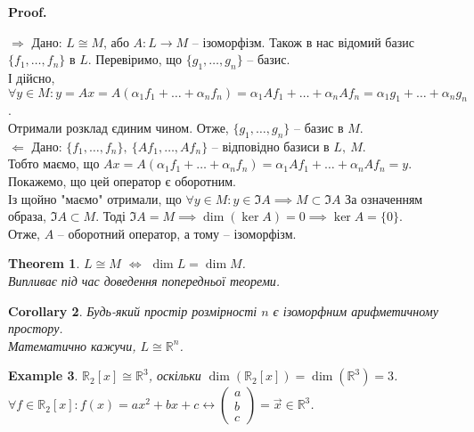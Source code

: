\documentclass[a4paper, 10pt]{article}
\makeatletter
\def\rightproof{$\boxed{\Rightarrow}$ }
\def\leftproof{$\boxed{\Leftarrow}$ }
\theoremstyle{theoremdd}
\newtheorem{theorem}{Theorem}[subsection]
\newtheorem{example}[theorem]{Example}
\newtheorem{corollary}[theorem]{Corollary}
\renewenvironment{proof}[1][Proof.\\]{\par
\pushQED{\hfill \qed}%
\normalfont \topsep6\p@\@plus6\p@\relax
\trivlist
\item\relax
{\bfseries
#1\@addpunct{.}}\hspace\labelsep\ignorespaces
}{%
\popQED\endtrivlist\@endpefalse
}
\makeatother
\begin{document}
	\begin{proof}
	\rightproof Дано: $L \cong M$, або $A \colon L \to M$ -- ізоморфізм. Також в нас відомий базис $\{f_1,\dots,f_n\}$ в $L$. Перевіримо, що $\{g_1,\dots,g_n\}$ -- базис.\\
	І дійсно, $\forall y \in M: y = Ax = A(\alpha_1 f_1 + \dots + \alpha_n f_n) = \alpha_1 Af_1 + \dots + \alpha_n Af_n = \alpha_1 g_1 + \dots + \alpha_n g_n$.\\
	Отримали розклад єдиним чином. Отже, $\{g_1,\dots,g_n\}$ -- базис в $M$.
	\bigskip \\
	\leftproof Дано: $\{f_1,\dots,f_n\},\ \{Af_1,\dots,Af_n\}$ -- відповідно базиси в $L,\ M$.\\
	Тобто маємо, що $Ax = A(\alpha_1 f_1 + \dots + \alpha_n f_n) = \alpha_1 Af_1 + \dots + \alpha_n Af_n = y$.\\
	Покажемо, що цей оператор є оборотним.\\
Із щойно "маємо" отримали, що $\forall y \in M: y \in \Im A \implies M \subset \Im A$ За означенням образа, $\Im A \subset M$. Тоді $\Im A = M \implies \dim(\ker A) = 0 \implies \ker A = \{0\}$.\\
	Отже, $A$ -- оборотний оператор, а тому -- ізоморфізм.
	\end{proof}
	
	\begin{theorem}
	$L \cong M$ $\iff$ $\dim L = \dim M$.\\
	\textit{Випливає під час доведення попередньої теореми.}
	\end{theorem}
	
	\begin{corollary}
	Будь-який простір розмірності $n$ є ізоморфним арифметичному простору.\\
	Математично кажучи, $L \cong \mathbb{R}^n$.
	\end{corollary}
	
	\begin{example}
	$\mathbb{R}_2[x] \cong \mathbb{R}^3$, оскільки $\dim(\mathbb{R}_2[x]) = \dim (\mathbb{R}^3) = 3$.\\
	$\forall f \in \mathbb{R}_2[x]: f(x) = ax^2 + bx +c \leftrightarrow \begin{pmatrix}
	a \\ b \\ c
	\end{pmatrix} = \vec{x} \in \mathbb{R}^3$.
	\end{example}
	
\end{document}
